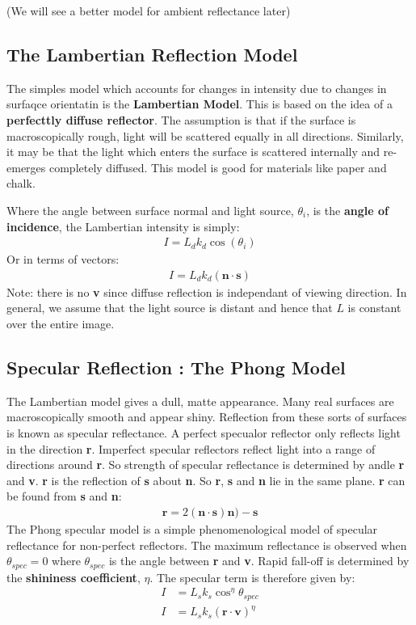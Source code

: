 \documentclass{article}
\begin{document}
(We will see a better model for ambient reflectance later)

\subsection{The Lambertian Reflection Model}
The simples model which accounts for changes in intensity due to changes in surfaqce orientatin is the \textbf{Lambertian Model}.
This is based on the idea of a \textbf{perfecttly diffuse reflector}.
The assumption is that if the surface is macroscopically rough, light will be scattered equally in all directions.
Similarly, it may be that the light which enters the surface is scattered internally and re-emerges completely diffused.
This model is good for materials like paper and chalk.

Where the angle between surface normal and light source, $\theta_i$, is the \textbf{angle of incidence}, the Lambertian intensity is simply:
\begin{align*}
	I = L_dk_d\cos(\theta_i)
\end{align*}
Or in terms of vectors:
\begin{align*}
	I = L_dk_d(\textbf{n}\cdot\textbf{s})
\end{align*}
Note: there is no \textbf{v} since diffuse reflection is independant of viewing direction.
In general, we assume that the light source is distant and hence that $L$ is constant over the entire image.

\subsection{Specular Reflection : The Phong Model}
The Lambertian model gives a dull, matte appearance.
Many real surfaces are macroscopically smooth and appear shiny.
Reflection from these sorts of surfaces is known as specular reflectance.
A perfect specualor reflector only reflects light in the direction \textbf{r}.
Imperfect specular reflectors reflect light into a range of directions around \textbf{r}.
So strength of specular reflectance is determined by andle \textbf{r} and \textbf{v}.
\textbf{r} is the reflection of \textbf{s} about \textbf{n}.
So \textbf{r}, \textbf{s} and \textbf{n} lie in the same plane.
\textbf{r} can be found from \textbf{s} and \textbf{n}: 
\begin{align*}
	\textbf{r} = 2(\textbf{n}\cdot\textbf{s})\textbf{n})-\textbf{s}
\end{align*}
The Phong specular model is a simple phenomenological model of specular reflectance for non-perfect reflectors.
The maximum reflectance is observed when $\theta_{spec} = 0$ where $\theta_{spec}$ is the angle between \textbf{r} and \textbf{v}.
Rapid fall-off is determined by the \textbf{shininess coefficient}, $\eta$.
The specular term is therefore given by:
\begin{align*}
	I &= L_sk_s\cos^{\eta}\theta_{spec} \\
	I &= L_sk_s(\textbf{r}\cdot\textbf{v})^\eta
\end{align*}
\end{document}
